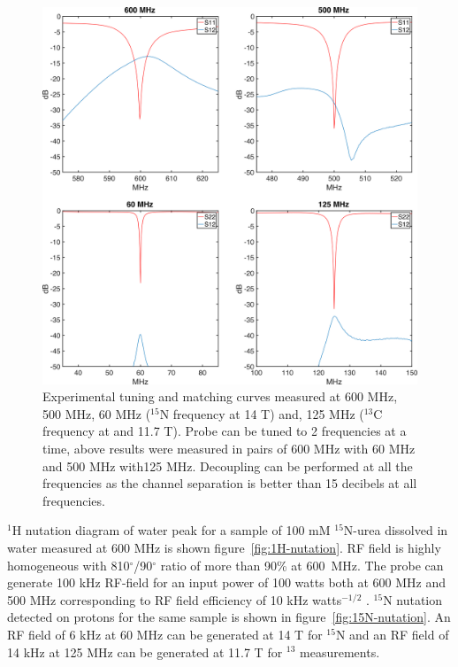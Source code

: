 \documentclass[preprint,12pt]{article}
\begin{document}
\begin{figure}
\centering
\includegraphics[width=\linewidth,keepaspectratio=true]{./figures/ms5n17-tlp-im-180710-tandm-sameaxis.png} 
\caption{Experimental tuning and matching curves measured at 600 MHz, 500 MHz, 60 MHz ($^{15}$N frequency at 14 T) and, 125 MHz ($^{13}$C frequency at  and 11.7 T). Probe can be tuned to 2 frequencies at a time, above results were measured in pairs of 600 MHz with 60 MHz and 500 MHz with125 MHz. Decoupling can be performed at all the frequencies as the channel separation is better than 15 decibels at all frequencies.}
\label{fig:tandm} 
\end{figure}
$^1$H nutation diagram of water peak for a sample of 100 mM $^{15}$N-urea dissolved in water measured at 600 MHz is shown figure~\ref{fig:1H-nutation}. RF field is highly homogeneous with 810$^{\circ}$/90$^{\circ}$ ratio of more than 90\% at 600~MHz. The probe can generate 100 kHz RF-field for an input power of 100 watts both at 600 MHz and 500 MHz corresponding to RF field efficiency of 10 kHz watts$^{-1/2}$ . $^{15}$N nutation detected on protons for the same sample is shown in figure~\ref{fig:15N-nutation}. An RF field of 6 kHz at 60 MHz can be generated at 14 T for $^{15}$N and an RF field of 14 kHz at 125 MHz can be generated at 11.7 T for $^{13}$ measurements.\par
\end{document}
